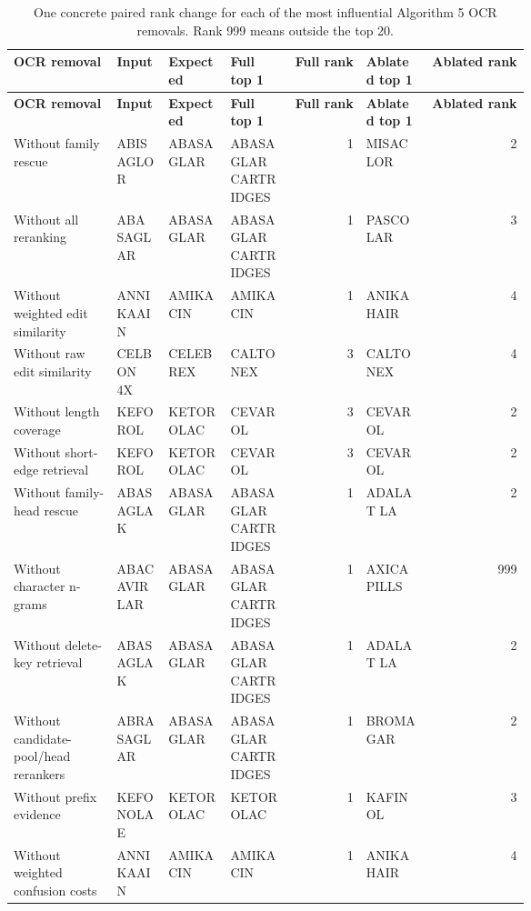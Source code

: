 \begin{tiny}
\setlength{\tabcolsep}{0.8pt}
\renewcommand{\arraystretch}{1.05}
\begin{longtable}{@{}L{0.20\linewidth}L{0.10\linewidth}L{0.12\linewidth}L{0.12\linewidth}rL{0.12\linewidth}r@{}}
\caption{One concrete paired rank change for each of the most influential Algorithm 5 OCR removals. Rank 999 means outside the top 20.}\label{tab:expanded-a5-ocr-ablation-examples}\\
\toprule
\textbf{OCR removal} & \textbf{Input} & \textbf{Expected} & \textbf{Full top 1} & \textbf{Full rank} & \textbf{Ablated top 1} & \textbf{Ablated rank} \\
\midrule
\endfirsthead
\toprule
\textbf{OCR removal} & \textbf{Input} & \textbf{Expected} & \textbf{Full top 1} & \textbf{Full rank} & \textbf{Ablated top 1} & \textbf{Ablated rank} \\
\midrule
\endhead
Without family rescue & ABISAGLOR & ABASAGLAR & ABASAGLAR CARTRIDGES & 1 & MISACLOR & 2 \\
Without all reranking & ABA SAGLAR & ABASAGLAR & ABASAGLAR CARTRIDGES & 1 & PASCOLAR & 3 \\
Without weighted edit similarity & ANNIKAAIN & AMIKACIN & AMIKACIN & 1 & ANIKA HAIR & 4 \\
Without raw edit similarity & CELBON 4X & CELEBREX & CALTONEX & 3 & CALTONEX & 4 \\
Without length coverage & KEFOROL & KETOROLAC & CEVAROL & 3 & CEVAROL & 2 \\
Without short-edge retrieval & KEFOROL & KETOROLAC & CEVAROL & 3 & CEVAROL & 2 \\
Without family-head rescue & ABASAGLAK & ABASAGLAR & ABASAGLAR CARTRIDGES & 1 & ADALAT LA & 2 \\
Without character n-grams & ABACAVIR LAR & ABASAGLAR & ABASAGLAR CARTRIDGES & 1 & AXICA PILLS & 999 \\
Without delete-key retrieval & ABASAGLAK & ABASAGLAR & ABASAGLAR CARTRIDGES & 1 & ADALAT LA & 2 \\
Without candidate-pool/head rerankers & ABRASAGLAR & ABASAGLAR & ABASAGLAR CARTRIDGES & 1 & BROMAGAR & 2 \\
Without prefix evidence & KEFONOLAE & KETOROLAC & KETOROLAC & 1 & KAFINOL & 3 \\
Without weighted confusion costs & ANNIKAAIN & AMIKACIN & AMIKACIN & 1 & ANIKA HAIR & 4 \\
\bottomrule
\end{longtable}
\end{tiny}

